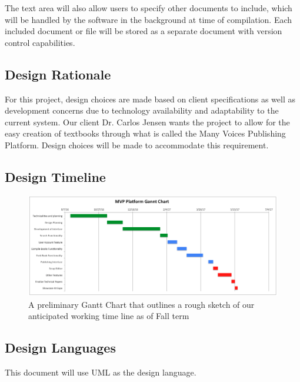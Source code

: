 \documentclass[onecolumn, draftclsnofoot,10pt, compsoc]{IEEEtran}
\begin{document}
\noindent The text area will also allow users to specify other documents to 
include, which will be handled by the software in the background at time of 
compilation. Each included document or file will be stored as a separate 
document with version control capabilities. \\


\subsection{Design Rationale}
\noindent For this project, design choices are made based on client 
specifications as well as development concerns due to technology availability 
and adaptability to the current system. Our client Dr. Carlos Jensen wants the 
project to allow for the easy creation of textbooks through what is called the 
Many Voices Publishing Platform. Design choices will be made to accommodate 
this requirement.


\newpage
\subsection{Design Timeline}
\begin{figure}[ht!]
\centering
\includegraphics[width=160mm]{gantt_chart.png}
\caption{A preliminary Gantt Chart that outlines a rough sketch of our anticipated working time line as of Fall term}
\end{figure}

\subsection{Design Languages}
{\noindent This document will use UML as the design language.\par}
\end{document}
